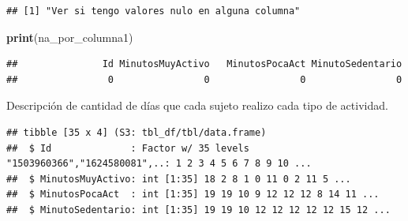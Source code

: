 \documentclass[
]{article}
\newenvironment{Shaded}{\begin{snugshade}}{\end{snugshade}}
\newcommand{\AttributeTok}[1]{\textcolor[rgb]{0.13,0.29,0.53}{#1}}
\newcommand{\ConstantTok}[1]{\textcolor[rgb]{0.56,0.35,0.01}{#1}}
\newcommand{\DecValTok}[1]{\textcolor[rgb]{0.00,0.00,0.81}{#1}}
\newcommand{\FunctionTok}[1]{\textcolor[rgb]{0.13,0.29,0.53}{\textbf{#1}}}
\newcommand{\NormalTok}[1]{#1}
\newcommand{\OtherTok}[1]{\textcolor[rgb]{0.56,0.35,0.01}{#1}}
\newcommand{\SpecialCharTok}[1]{\textcolor[rgb]{0.81,0.36,0.00}{\textbf{#1}}}
\begin{document}
\begin{verbatim}
## [1] "Ver si tengo valores nulo en alguna columna"
\end{verbatim}

\begin{Shaded}
\begin{Highlighting}[]
\FunctionTok{print}\NormalTok{(na\_por\_columna1)}
\end{Highlighting}
\end{Shaded}

\begin{verbatim}
##               Id MinutosMuyActivo   MinutosPocaAct MinutoSedentario 
##                0                0                0                0
\end{verbatim}

Descripción de cantidad de días que cada sujeto realizo cada tipo de
actividad.

\begin{Shaded}
\end{Shaded}

\begin{verbatim}
## tibble [35 x 4] (S3: tbl_df/tbl/data.frame)
##  $ Id              : Factor w/ 35 levels "1503960366","1624580081",..: 1 2 3 4 5 6 7 8 9 10 ...
##  $ MinutosMuyActivo: int [1:35] 18 2 8 1 0 11 0 2 11 5 ...
##  $ MinutosPocaAct  : int [1:35] 19 19 10 9 12 12 12 8 14 11 ...
##  $ MinutoSedentario: int [1:35] 19 19 10 12 12 12 12 12 15 12 ...
\end{verbatim}
\end{document}
